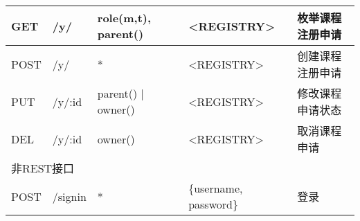\begin{longtable}{|p{1.2cm}|p{3cm}|p{3cm}|p{4cm}|X|}
  GET  & /y/    & role(m,t), parent()& <REGISTRY> & 枚举课程注册申请 \\ \hline
  POST & /y/    & *                  & <REGISTRY> & 创建课程注册申请 \\ \hline
  PUT  & /y/:id & parent() | owner() & <REGISTRY> & 修改课程申请状态 \\ \hline
  DEL  & /y/:id & owner()            & <REGISTRY> & 取消课程申请     \\ \hline

  \multicolumn{5}{|l|}{非REST接口} \\ \hline
  POST    & /signin                      & *             & \{username, password\} & 登录 \\ \hline

\end{longtable}

